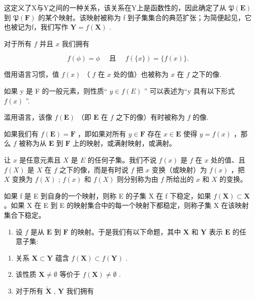 这定义了X与Y之间的一种关系，该关系在Y上是函数性的，因此确定了从 \(\mathfrak{P}(\mathbf{E})\) 到 \(\mathfrak{P}(\mathbf{F})\) 的某个映射。该映射被称为 f 到子集集合的典范扩张；为简便起见，它也被记为f，我们写作 \(\mathbf{Y}=f(\mathbf{X})\) .

对于所有 \(f\) 并且 \(x\) 我们拥有

\[
f (\phi) = \phi \quad \text { 且 } \quad f (\{x \}) = \{f (x) \}.
\]

借用语言习惯，值 \(f(x)\) （ \(f\) 在 \(x\) 处的值）也被称为 \(x\) 在 \(f\) 之下的像.

如果 y 是 F 的一般元素，则性质“ \(y \in f(E)\) '' 可以表述为“y 具有以下形式 \(f(x)\) ''.

滥用语言，该像 \(f(\mathbf{E})\) （即 \(\mathbf{E}\) 在 \(f\) 之下的像）有时被称为 \(f\) 的像.

如果我们有 \(f(\mathbf{E}) = \mathbf{F}\) ，即如果对所有 \(y \in \mathbf{F}\) 存在 \(x \in \mathbf{E}\) 使得 \(y = f(x)\) ，那么 \(f\) 被称为从 \(\mathbf{E}\) 到 \(\mathbf{F}\) 上的映射，或满射映射，或满射。

让 \(x\) 是任意元素且 \(X\) 是 \(E\) 的任何子集。我们不说 \(f(x)\) 是 \(f\) 在 \(x\) 处的值、且 \(f(X)\) 是 \(X\) 在 \(f\) 之下的像，而是有时说 \(f\) 把 \(x\) 变换（或映射）为 \(f(x)\) ，把 \(X\) 变换为 \(f(X)\) ; \(f(x)\) 和 \(f(X)\) 则分别称为由 \(f\) 所给出的 \(x\) 和 \(X\) 的变换。

如果 f 是 E 到自身的一个映射，则称 E 的子集 X 在 f 下稳定，如果 \(f(\mathbf{X}) \subset \mathbf{X}\) 。如果 X 在 E 到 E 的映射集合中的每一个映射下都稳定，则称子集 X 在该映射集合下稳定。

\begin{enumerate}
\def\labelenumi{\arabic{enumi}.}
\setcounter{enumi}{4}
\tightlist
\item
  设 \(f\) 是从 \(\mathbf{E}\) 到 \(\mathbf{F}\) 的映射。于是我们有以下命题，其中 \(\mathbf{X}\) 和 \(\mathbf{Y}\) 表示 \(\mathbf{E}\) 的任意子集:
\end{enumerate}

\begin{enumerate}
\def\labelenumi{(\alph{enumi})}
\item
  关系 \(\mathbf{X} \subset \mathbf{Y}\) 蕴含 \(f(\mathbf{X}) \subset f(\mathbf{Y})\) .
\item
  该性质 \(\mathbf{X} \neq \emptyset\) 等价于 \(f(\mathbf{X}) \neq \emptyset\) .
\item
  对于所有 \(\tilde{\mathbf{X}}\) , \(\mathbf{Y}\) 我们拥有
\end{enumerate}

